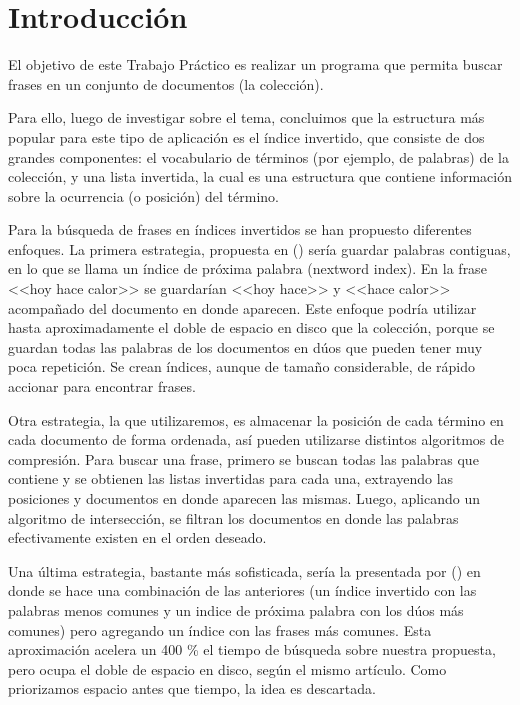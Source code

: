 \section{Introducción}

El objetivo de este Trabajo Práctico es realizar un programa que permita buscar frases en un conjunto de documentos (la colección).

Para ello, luego de investigar sobre el tema, concluimos que la estructura más popular para este tipo de aplicación es el índice invertido, que consiste de dos grandes componentes: el vocabulario de términos (por ejemplo, de palabras) de la colección, y una lista invertida, la cual es una estructura que contiene información sobre la ocurrencia (o posición) del término.

Para la búsqueda de frases en índices invertidos se han propuesto diferentes enfoques. La primera estrategia, propuesta en \citet{Williams99what'snext?} (\citeyear{Williams99what'snext?}) sería guardar palabras contiguas, en lo que se llama un índice de próxima palabra (nextword index). En la frase <<hoy hace calor>> se guardarían <<hoy hace>> y <<hace calor>> acompañado del documento en donde aparecen. Este enfoque podría utilizar hasta aproximadamente el doble de espacio en disco que la colección, porque se guardan todas las palabras de los documentos en dúos que pueden tener muy poca repetición. Se crean índices, aunque de tamaño considerable, de rápido accionar para encontrar frases.

Otra estrategia, la que utilizaremos, es almacenar la posición de cada término en cada documento de forma ordenada, así pueden utilizarse distintos algoritmos de compresión. Para buscar una frase, primero se buscan todas las palabras que contiene y se obtienen las listas invertidas para cada una, extrayendo las posiciones y documentos en donde aparecen las mismas. Luego, aplicando un algoritmo de intersección, se filtran los documentos en donde las palabras efectivamente existen en el orden deseado.

Una última estrategia, bastante más sofisticada, sería la presentada por \citet{Williams:2004:FPQ:1028099.1028102} (\citeyear{Williams:2004:FPQ:1028099.1028102}) en donde se hace una combinación de las anteriores (un índice invertido con las palabras menos comunes y un indice de próxima palabra con los dúos más comunes) pero agregando un índice con las frases más comunes. Esta aproximación acelera un 400 \% el tiempo de búsqueda sobre nuestra propuesta, pero ocupa el doble de espacio en disco, según el mismo artículo. Como priorizamos espacio antes que tiempo, la idea es descartada.



